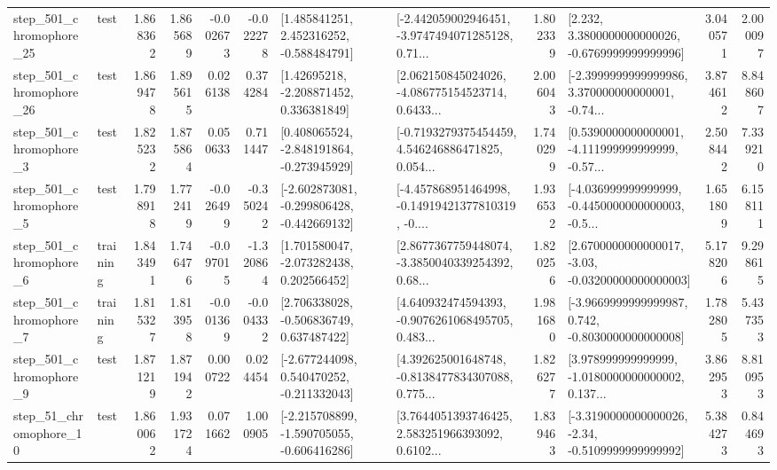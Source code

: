 \begin{tabular}{llrrrrllrlrr}
  step\_501\_chromophore\_25 &      test &      1.868362 &    1.865689 &     -0.002673 & -0.022278 &    [1.485841251, 2.452316252, -0.588484791] &  [-2.442059002946451, -3.9747494071285128, 0.71... &       1.802339 &   [2.232, 3.3800000000000026, -0.6769999999999996] &            3.040571 &          2.000097 \\
  step\_501\_chromophore\_26 &      test &      1.869478 &    1.895615 &      0.026138 &  0.374284 &     [1.42695218, -2.208871452, 0.336381849] &  [2.062150845024026, -4.086775154523714, 0.6433... &       2.006043 &  [-2.3999999999999986, 3.370000000000001, -0.74... &            3.874612 &          8.848607 \\
   step\_501\_chromophore\_3 &      test &      1.825232 &    1.875864 &      0.050633 &  0.711447 &   [0.408065524, -2.848191864, -0.273945929] &  [-0.7193279375454459, 4.546246886471825, 0.054... &       1.740299 &  [0.5390000000000001, -4.111999999999999, -0.57... &            2.508442 &          7.339210 \\
   step\_501\_chromophore\_5 &      test &      1.798918 &    1.772419 &     -0.026499 & -0.350242 &  [-2.602873081, -0.299806428, -0.442669132] &  [-4.457868951464998, -0.14919421377810319, -0.... &       1.936532 &  [-4.036999999999999, -0.4450000000000003, -0.5... &            1.651809 &          6.158111 \\
   step\_501\_chromophore\_6 &  training &      1.843491 &    1.746476 &     -0.097015 & -1.320864 &    [1.701580047, -2.073282438, 0.202566452] &  [2.8677367759448074, -3.3850040339254392, 0.68... &       1.820256 &  [2.6700000000000017, -3.03, -0.03200000000000003] &            5.178206 &          9.298615 \\
   step\_501\_chromophore\_7 &  training &      1.815327 &    1.813958 &     -0.001369 & -0.004332 &    [2.706338028, -0.506836749, 0.637487422] &  [4.640932474594393, -0.9076261068495705, 0.483... &       1.981680 &  [-3.9669999999999987, 0.742, -0.8030000000000008] &            1.782805 &          5.437353 \\
   step\_501\_chromophore\_9 &      test &      1.871219 &    1.871942 &      0.000722 &  0.024454 &   [-2.677244098, 0.540470252, -0.211332043] &  [4.392625001648748, -0.8138477834307088, 0.775... &       1.826277 &  [3.978999999999999, -1.0180000000000002, 0.137... &            3.862953 &          8.810953 \\
   step\_51\_chromophore\_10 &      test &      1.860062 &    1.931724 &      0.071662 &  1.000905 &  [-2.215708899, -1.590705055, -0.606416286] &  [3.7644051393746425, 2.583251966393092, 0.6102... &       1.839463 &  [-3.3190000000000026, -2.34, -0.5109999999999992] &            5.384273 &          0.844693 \\

\end{tabular}
